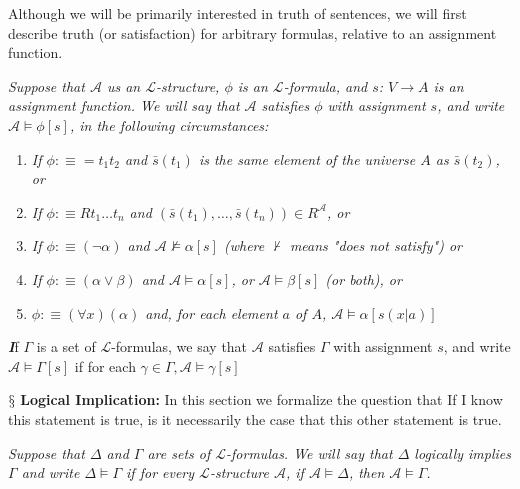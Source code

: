 \documentclass[10pt,a4paper]{article}
\newenvironment{callout}
	{\begin{calloutbox}\color{charcoal}\textbf\textit}
	{\end{calloutbox}}
\newcommand{\newpoint}[1]{\indent$\mathsection$ \textbf{#1}}
\newcommand{\curveL}{\mathcal{L}}
\newcommand{\curveA}{\mathcal{A}}
\begin{document}
                    Although we will be primarily interested in truth of sentences, we will
                    first describe truth (or satisfaction) for arbitrary formulas, relative to an
                    assignment function.
                    \begin{define}
                        \textit{Suppose that $\curveA$ us an $\curveL$-structure, $\phi$ is an $\curveL$-formula, and $s$: $V\rightarrow A$ is an assignment function. We will say that $\curveA$ satisfies $\phi$ with assignment $s$, and write $\curveA\vDash \phi[s]$, in the following circumstances:}
                        \begin{enumerate}
                            \item \textit{If $\phi :\equiv =t_1t_2$ and $\bar s(t_1)$ is the same element of the universe $A$ as $\bar s(t_2)$, or}
                            \item \textit{If $\phi :\equiv Rt_1\dots t_n$ and $(\bar s(t_1),\dots,\bar s(t_n))\in R^\curveA$, or}
                            \item \textit{If $\phi:\equiv (\neg \alpha)$ and $\curveA \not\vDash \alpha[s]$ (where $\not\vdash$ means "does not satisfy") or}
                            \item \textit{If $\phi:\equiv (\alpha\lor\beta)$ and $\curveA\vDash\alpha[s]$, or $\curveA \vDash\beta[s]$ (or both), or}
                            \item \textit{$\phi:\equiv(\forall x)(\alpha)$ and, for each element $a$ of $A$, $\curveA\vDash \alpha[s(x|a)]$}
                        \end{enumerate}
                    \end{define}
                    \begin{callout}
                        If $\Gamma$ is a set of $\curveL$-formulas, we say that $\curveA$ satisfies $\Gamma$ with assignment $s$, and write $\curveA\vDash \Gamma[s]$ if for each $\gamma\in\Gamma, \curveA\vDash \gamma[s]$
                    \end{callout}
                    \newpoint{Logical Implication: } In this section we formalize the question that If I know this statement is true, is it necessarily the case that this other statement is true.
                    \begin{define}
                        \textit{Suppose that $\Delta$ and $\Gamma$ are sets of $\curveL$-formulas. We will say that $\Delta$ logically implies $\Gamma$ and write $\Delta\vDash \Gamma$ if for every $\curveL$-structure $\curveA$, if $\curveA\vDash\Delta$, then $\curveA\vDash\Gamma$.}
                    \end{define}
\end{document}
